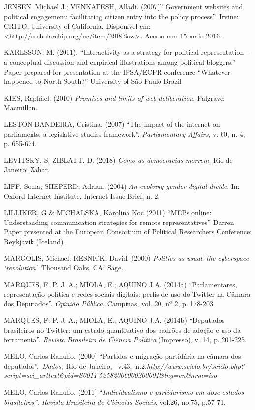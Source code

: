 JENSEN, Michael J.; VENKATESH, Alladi. (2007)'' Government websites and
political engagement: facilitating citizen entry into the policy
process''. Irvine: CRITO, University of California. Disponível em:
\textless{}http://escholarship.org/uc/item/39f8f9sw\textgreater{}.
Acesso em: 15 maio 2016.

KARLSSON, M. (2011). ``Interactivity as a strategy for political
representation -- a conceptual discussion and empirical illustrations
among political bloggers.'' Paper prepared for presentation at the
IPSA/ECPR conference ``Whatever happened to North-South?'' University of
São Paulo-Brazil

KIES, Raphäel. (2010) \emph{Promises and limits of web-deliberation}.
Palgrave: Macmillan.

LESTON-BANDEIRA, Cristina. (2007) ``The impact of the internet on
parliaments: a legislative studies framework''. \emph{Parliamentary
Affairs}, v. 60, n. 4, p. 655-674.

LEVITSKY, S. ZIBLATT, D. (2018) \emph{Como as democracias morrem}. Rio
de Janeiro: Zahar.

LIFF, Sonia; SHEPERD, Adrian. (2004) \emph{An evolving gender digital
divide}. In: Oxford Internet Institute, Internet Issue Brief, n. 2.

LILLIKER, G \& MICHALSKA, Karolina Koc (2011) ``MEPs online:
Understanding communication strategies for remote representatives''
Darren Paper presented at the European Consortium of Political
Researchers Conference: Reykjavik (Iceland),

MARGOLIS, Michael; RESNICK, David. (2000) \emph{Politics as usual}:
\emph{the cyberspace `revolution'}. Thousand Oaks, CA: Sage.

MARQUES, F. P. J. A.; MIOLA, E.; AQUINO J.A. (2014a) ``Parlamentares,
representação política e redes sociais digitais: perfis de uso do
Twitter na Câmara dos Deputados''. \emph{Opinião Pública}, Campinas,
vol. 20, nº 2, p. 178-203

MARQUES, F. P. J. A.; MIOLA, E.; AQUINO J.A. (2014b) ``Deputados
brasileiros no Twitter: um estudo quantitativo dos padrões de adoção e
uso da ferramenta''. \emph{Revista Brasileira de Ciência Política}
(Impresso), v. 14, p. 201-225.

MELO, Carlos Ranulfo. (2000) ``Partidos e migração partidária na câmara
dos deputados''.~\emph{Dados},~Rio de Janeiro,~
v.43,~n.2.\emph{http://www.scielo.br/scielo.php?script=sci\_arttext\&pid=S0011-52582000000200001\&lng=en\&nrm=iso}

MELO, Carlos Ranulfo. (2011) ``\emph{Individualismo e partidarismo em
doze estados brasileiros''}. \emph{Revista Brasileira de Ciências
Sociais}, vol.26, no.75, p.57-71.

